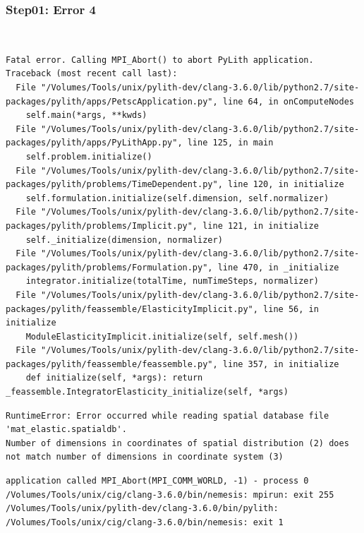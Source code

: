 \documentclass{beamer}
\begin{document}
\begin{frame}[fragile]
  \frametitle{Step01: Error 4}

\\
\begin{lstlisting}
Fatal error. Calling MPI_Abort() to abort PyLith application.
Traceback (most recent call last):
  File "/Volumes/Tools/unix/pylith-dev/clang-3.6.0/lib/python2.7/site-packages/pylith/apps/PetscApplication.py", line 64, in onComputeNodes
    self.main(*args, **kwds)
  File "/Volumes/Tools/unix/pylith-dev/clang-3.6.0/lib/python2.7/site-packages/pylith/apps/PyLithApp.py", line 125, in main
    self.problem.initialize()
  File "/Volumes/Tools/unix/pylith-dev/clang-3.6.0/lib/python2.7/site-packages/pylith/problems/TimeDependent.py", line 120, in initialize
    self.formulation.initialize(self.dimension, self.normalizer)
  File "/Volumes/Tools/unix/pylith-dev/clang-3.6.0/lib/python2.7/site-packages/pylith/problems/Implicit.py", line 121, in initialize
    self._initialize(dimension, normalizer)
  File "/Volumes/Tools/unix/pylith-dev/clang-3.6.0/lib/python2.7/site-packages/pylith/problems/Formulation.py", line 470, in _initialize
    integrator.initialize(totalTime, numTimeSteps, normalizer)
  File "/Volumes/Tools/unix/pylith-dev/clang-3.6.0/lib/python2.7/site-packages/pylith/feassemble/ElasticityImplicit.py", line 56, in initialize
    ModuleElasticityImplicit.initialize(self, self.mesh())
  File "/Volumes/Tools/unix/pylith-dev/clang-3.6.0/lib/python2.7/site-packages/pylith/feassemble/feassemble.py", line 357, in initialize
    def initialize(self, *args): return _feassemble.IntegratorElasticity_initialize(self, *args)
\end{lstlisting}
\begin{lstlisting}
RuntimeError: Error occurred while reading spatial database file 'mat_elastic.spatialdb'.
Number of dimensions in coordinates of spatial distribution (2) does
not match number of dimensions in coordinate system (3)
\end{lstlisting}
\begin{lstlisting}
application called MPI_Abort(MPI_COMM_WORLD, -1) - process 0
/Volumes/Tools/unix/cig/clang-3.6.0/bin/nemesis: mpirun: exit 255
/Volumes/Tools/unix/pylith-dev/clang-3.6.0/bin/pylith: /Volumes/Tools/unix/cig/clang-3.6.0/bin/nemesis: exit 1
\end{lstlisting}

\end{frame}
\end{document}

